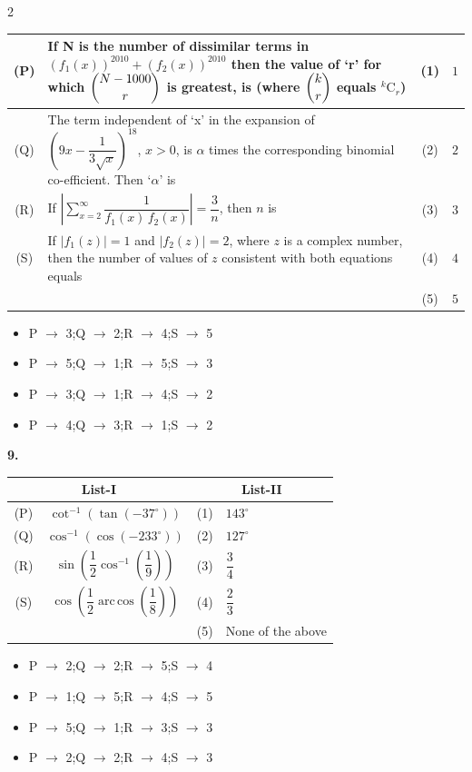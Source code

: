 \documentclass[10pt]{extarticle}
\newcommand{\qn}[1]{\par\smallskip\noindent\textbf{#1.}~}
\newenvironment{qoptions}{\begin{itemize}[leftmargin=1.8em,itemsep=1pt,topsep=2pt,label={}]}{\end{itemize}}
\newcommand{\opt}[2]{\item[(#1)] #2}
\begin{document}
\begin{multicols}{2}
\begin{center}
\begin{tabular}{|c|p{3.9cm}|c|c|}
(P) & If N is the number of dissimilar terms in $(f_1(x))^{2010}+(f_2(x))^{2010}$ then the value of `r' for which $\dbinom{N-1000}{r}$ is greatest, is (where $\dbinom{k}{r}$ equals ${}^k\mathrm{C}_r$) & (1) & $1$\\ \hline
(Q) & The term independent of `x' in the expansion of $\left(9x-\dfrac{1}{3\sqrt{x}}\right)^{18}$, $x>0$, is $\alpha$ times the corresponding binomial co-efficient. Then `$\alpha$' is & (2) & $2$\\ \hline
(R) & If $\displaystyle\left|\sum_{x=2}^{\infty}\dfrac{1}{f_1(x)\,f_2(x)}\right|=\dfrac{3}{n}$, then $n$ is & (3) & $3$\\ \hline
(S) & If $|f_1(z)|=1$ and $|f_2(z)|=2$, where $z$ is a complex number, then the number of values of $z$ consistent with both equations equals & (4) & $4$\\ \hline
 & & (5) & $5$\\ \hline
\end{tabular}
\end{center}
\begin{qoptions}
\opt{A}{P $\to$ 3;Q $\to$ 2;R $\to$ 4;S $\to$ 5}
\opt{B}{P $\to$ 5;Q $\to$ 1;R $\to$ 5;S $\to$ 3}
\opt{C}{P $\to$ 3;Q $\to$ 1;R $\to$ 4;S $\to$ 2}
\opt{D}{P $\to$ 4;Q $\to$ 3;R $\to$ 1;S $\to$ 2}
\end{qoptions}
\qn{9}\par\nopagebreak[4]
\begin{center}\small\setlength{\tabcolsep}{3pt}
\begin{tabular}{|c|c|c|l|}
\hline
\multicolumn{2}{|c|}{List-I} & \multicolumn{2}{c|}{List-II}\\ \hline
(P) & $\cot^{-1}\left(\tan(-37^\circ)\right)$ & (1) & $143^\circ$\\ \hline
(Q) & $\cos^{-1}\left(\cos(-233^\circ)\right)$ & (2) & $127^\circ$\\ \hline
(R) & $\sin\left(\dfrac12\cos^{-1}\left(\dfrac19\right)\right)$ & (3) & $\dfrac34$\\ \hline
(S) & $\cos\left(\dfrac12\operatorname{arc\,cos}\left(\dfrac18\right)\right)$ & (4) & $\dfrac23$\\ \hline
 & & (5) & None of the above\\ \hline
\end{tabular}
\end{center}
\begin{qoptions}
\opt{A}{P $\to$ 2;Q $\to$ 2;R $\to$ 5;S $\to$ 4}
\opt{B}{P $\to$ 1;Q $\to$ 5;R $\to$ 4;S $\to$ 5}
\opt{C}{P $\to$ 5;Q $\to$ 1;R $\to$ 3;S $\to$ 3}
\opt{D}{P $\to$ 2;Q $\to$ 2;R $\to$ 4;S $\to$ 3}

\end{qoptions}
\end{multicols}
\end{document}
